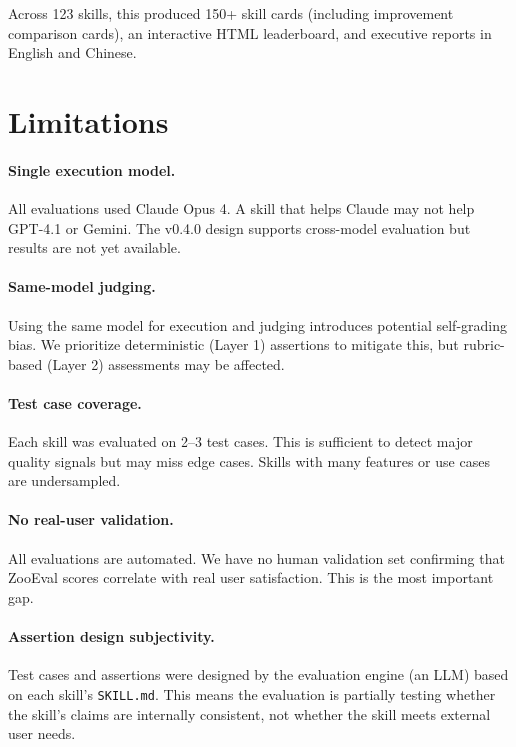 \documentclass[11pt,a4paper]{article}
\begin{document}
Across 123 skills, this produced 150+ skill cards (including improvement comparison cards), an interactive HTML leaderboard, and executive reports in English and Chinese.

\section{Limitations}
\label{sec:limitations}

\paragraph{Single execution model.}
All evaluations used Claude Opus 4. A skill that helps Claude may not help GPT-4.1 or Gemini. The v0.4.0 design supports cross-model evaluation but results are not yet available.

\paragraph{Same-model judging.}
Using the same model for execution and judging introduces potential self-grading bias. We prioritize deterministic (Layer 1) assertions to mitigate this, but rubric-based (Layer 2) assessments may be affected.

\paragraph{Test case coverage.}
Each skill was evaluated on 2--3 test cases. This is sufficient to detect major quality signals but may miss edge cases. Skills with many features or use cases are undersampled.

\paragraph{No real-user validation.}
All evaluations are automated. We have no human validation set confirming that ZooEval scores correlate with real user satisfaction. This is the most important gap.

\paragraph{Assertion design subjectivity.}
Test cases and assertions were designed by the evaluation engine (an LLM) based on each skill's \texttt{SKILL.md}. This means the evaluation is partially testing whether the skill's claims are internally consistent, not whether the skill meets external user needs.
\end{document}
